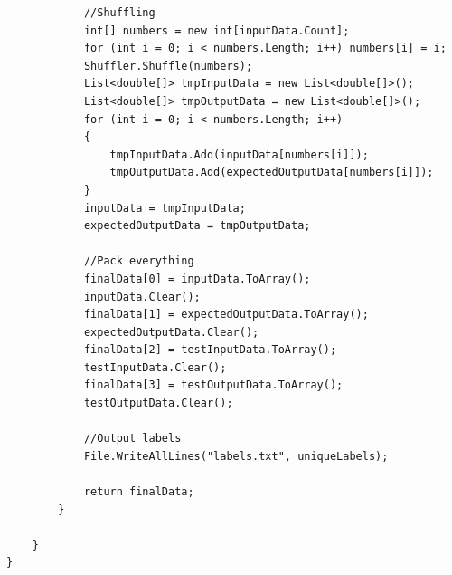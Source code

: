 \documentclass[12pt,a4paper]{article}
\begin{document}
\begin{lstlisting}
            //Shuffling
            int[] numbers = new int[inputData.Count];
            for (int i = 0; i < numbers.Length; i++) numbers[i] = i;
            Shuffler.Shuffle(numbers);
            List<double[]> tmpInputData = new List<double[]>();
            List<double[]> tmpOutputData = new List<double[]>();
            for (int i = 0; i < numbers.Length; i++)
            {
                tmpInputData.Add(inputData[numbers[i]]);
                tmpOutputData.Add(expectedOutputData[numbers[i]]);
            }
            inputData = tmpInputData;
            expectedOutputData = tmpOutputData;

            //Pack everything 
            finalData[0] = inputData.ToArray();
            inputData.Clear();
            finalData[1] = expectedOutputData.ToArray();
            expectedOutputData.Clear();
            finalData[2] = testInputData.ToArray();
            testInputData.Clear();
            finalData[3] = testOutputData.ToArray();
            testOutputData.Clear();

            //Output labels
            File.WriteAllLines("labels.txt", uniqueLabels);

            return finalData;
        }

    }
}\end{lstlisting}
\pagebreak
\end{document}
